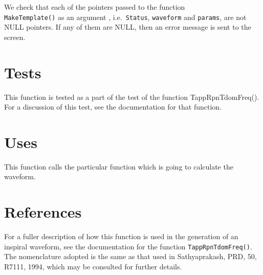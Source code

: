 \documentclass[12pt]{article}
\begin{document}
We check that each of the pointers passed to the function \\ \texttt{MakeTemplate()} as an argument , i.e.\ \texttt{Status}, \texttt{waveform} and \texttt{params}, are not NULL pointers. If any of them are NULL, then an error message is sent to the screen.



\section{Tests}

This function is tested as a part of the test of the function TappRpnTdomFreq(). For a discussion of this test, see the documentation for that function.

\section{Uses}

This function calls the particular function which is going to calculate the waveform.


\section{References}
For a fuller description of how this function is used in the generation of an inspiral waveform, see the documentation for the function \texttt{TappRpnTdomFreq()}.
The nomenclature adopted is the same as that used in Sathyaprakash, PRD, 50, R7111, 1994, which may be consulted for further details.
\end{document}
